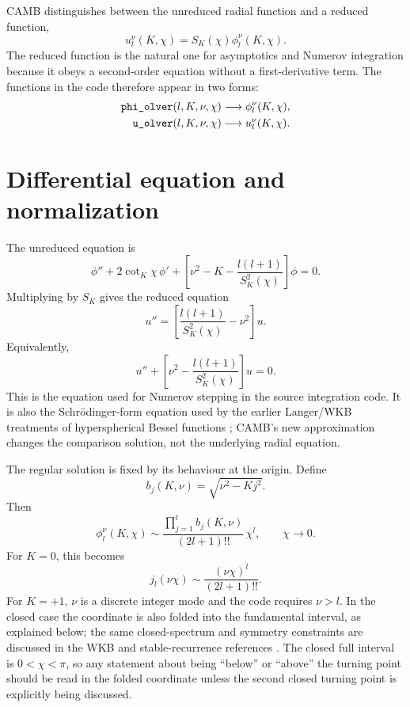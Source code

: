 \documentclass[11pt,a4paper]{article}
\newcommand{\code}[1]{\texttt{\detokenize{#1}}}
\newcommand{\SK}{S_K}
\newcommand{\cotK}{\cot_K}
\begin{document}
CAMB distinguishes between the unreduced radial function and a reduced function,
\begin{equation}
  u_l^\nu(K,\chi)=\SK(\chi)\phi_l^\nu(K,\chi).
\end{equation}
The reduced function is the natural one for asymptotics and Numerov integration because it obeys a second-order equation without a first-derivative term.  The functions in the code therefore appear in two forms:
\begin{align}
  \code{phi_olver}(l,K,\nu,\chi)&\longrightarrow \phi_l^\nu(K,\chi),\\
  \code{u_olver}(l,K,\nu,\chi)&\longrightarrow u_l^\nu(K,\chi).
\end{align}

\section{Differential equation and normalization}

The unreduced equation is
\begin{equation}
  \phi''+2\cotK\chi\,\phi'
  +\left[\nu^2-K-\frac{l(l+1)}{\SK^2(\chi)}\right]\phi=0.
  \label{eq:phi-equation}
\end{equation}
Multiplying by \(\SK\) gives the reduced equation
\begin{equation}
  u''=\left[\frac{l(l+1)}{\SK^2(\chi)}-\nu^2\right]u.
  \label{eq:reduced-equation}
\end{equation}
Equivalently,
\begin{equation}
  u''+\left[\nu^2-\frac{l(l+1)}{\SK^2(\chi)}\right]u=0.
  \label{eq:oscillator-form}
\end{equation}
This is the equation used for Numerov stepping in the source integration code.  It is also the Schr\"odinger-form equation used by the earlier Langer/WKB treatments of hyperspherical Bessel functions \cite{kosowsky1998,tram2013}; CAMB's new approximation changes the comparison solution, not the underlying radial equation.

The regular solution is fixed by its behaviour at the origin.  Define
\begin{equation}
  b_j(K,\nu)=\sqrt{\nu^2-Kj^2}.
\end{equation}
Then
\begin{equation}
  \phi_l^\nu(K,\chi)\sim
  \frac{\prod_{j=1}^{l} b_j(K,\nu)}{(2l+1)!!}\,\chi^l,
  \qquad \chi\to0.
  \label{eq:normalization}
\end{equation}
For \(K=0\), this becomes
\begin{equation}
  j_l(\nu\chi)\sim \frac{(\nu\chi)^l}{(2l+1)!!}.
\end{equation}
For \(K=+1\), \(\nu\) is a discrete integer mode and the code requires \(\nu>l\).
In the closed case the coordinate is also folded into the fundamental interval,
as explained below; the same closed-spectrum and symmetry constraints are
discussed in the WKB and stable-recurrence references
\cite{kosowsky1998,tram2013}.  The closed full interval is \(0<\chi<\pi\), so
any statement about being ``below'' or ``above'' the turning point should be
read in the folded coordinate unless the second closed turning point is
explicitly being discussed.
\end{document}
